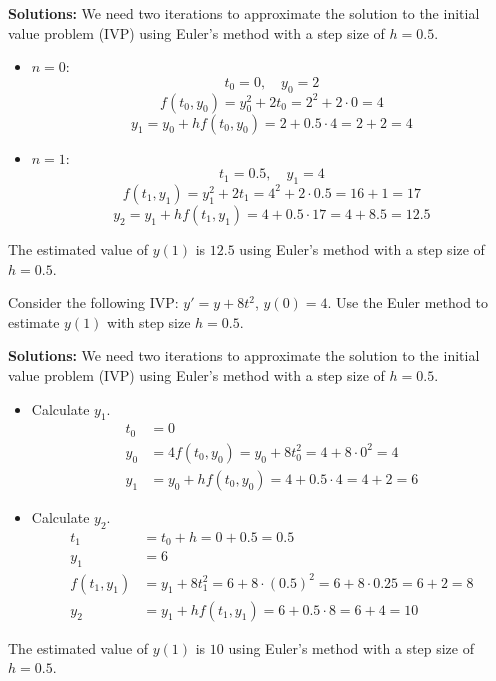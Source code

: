 \ifnum {} {\color{DarkBlue} 
\textbf{Solutions:} We need two iterations to approximate the solution to the initial value problem (IVP) using Euler's method with a step size of \( h = 0.5 \).

\begin{itemize}
    \item \( n = 0 \):
     \[
     t_0 = 0, \quad y_0 = 2
     \]
     \[
     f(t_0, y_0) = y_0^2 + 2t_0 = 2^2 + 2 \cdot 0 = 4
     \]
     \[
     y_1 = y_0 + h f(t_0, y_0) = 2 + 0.5 \cdot 4 = 2 + 2 = 4
     \]
    \item \( n = 1 \):
     \[
     t_1 = 0.5, \quad y_1 = 4
     \]
     \[
     f(t_1, y_1) = y_1^2 + 2t_1 = 4^2 + 2 \cdot 0.5 = 16 + 1 = 17
     \]
     \[
     y_2 = y_1 + h f(t_1, y_1) = 4 + 0.5 \cdot 17 = 4 + 8.5 = 12.5
     \]
\end{itemize}

The estimated value of \( y(1) \) is \( 12.5 \) using Euler's method with a step size of \( h = 0.5 \).
} 
\else 
\newpage
\fi
\fi 



\ifnum {}
\question[4] Consider the following IVP: $y' = y + 8t^2$, $y(0) = 4$. Use the Euler method to estimate $y(1)$ with step size $h=0.5$.

\ifnum {} {\color{DarkBlue} 
\textbf{Solutions:} We need two iterations to approximate the solution to the initial value problem (IVP) using Euler's method with a step size of \( h = 0.5 \).

\begin{itemize}
    \item Calculate $y_1$. 
        \begin{align}
            t_0 &= 0 \\
            y_0 &= 4 f(t_0, y_0) = y_0 + 8t_0^2 = 4 + 8 \cdot 0^2 = 4 \\
            y_1 &= y_0 + h f(t_0, y_0) = 4 + 0.5 \cdot 4 = 4 + 2 = 6
        \end{align}
            
    \item Calculate \( y_2 \).
        \begin{align}
            t_1 &= t_0 + h = 0 + 0.5 = 0.5 \\
            y_1 &= 6 \\
            f(t_1, y_1) &= y_1 + 8t_1^2 = 6 + 8 \cdot (0.5)^2 = 6 + 8 \cdot 0.25 = 6 + 2 = 8 \\
          y_2 &= y_1 + h f(t_1, y_1) = 6 + 0.5 \cdot 8 = 6 + 4 = 10
        \end{align} 
\end{itemize}

The estimated value of \( y(1) \) is \( 10 \) using Euler's method with a step size of \( h = 0.5 \).
} 
\else 
\newpage
\fi
\fi 